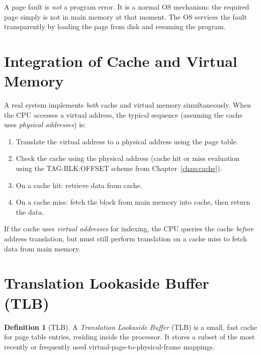 \documentclass[11pt, a4paper, notitlepage]{report}
\theoremstyle{definition}
\newtheorem{definition}[theorem]{Definition}
\theoremstyle{remark}
\theoremstyle{definition}
\begin{document}
\begin{warning}[title={Warning: Page Fault $\ne$ Error}]
  A page fault is \emph{not} a program error. It is a normal OS mechanism: the required page simply is not in main memory at that moment. The OS services the fault transparently by loading the page from disk and resuming the program.
\end{warning}

\section{Integration of Cache and Virtual Memory}
\label{sec:cache-vm-integration}

A real system implements \emph{both} cache and virtual memory simultaneously. When the CPU accesses a virtual address, the typical sequence (assuming the cache uses \emph{physical addresses}) is:

\begin{enumerate}
  \item Translate the virtual address to a physical address using the page table.
  \item Check the cache using the physical address (cache hit or miss evaluation using the TAG:BLK:OFFSET scheme from Chapter~\ref{chap:cache}).
  \item On a cache hit: retrieve data from cache.
  \item On a cache miss: fetch the block from main memory into cache, then return the data.
\end{enumerate}

If the cache uses \emph{virtual addresses} for indexing, the CPU queries the cache \emph{before} address translation, but must still perform translation on a cache miss to fetch data from main memory.

\section{Translation Lookaside Buffer (TLB)}
\label{sec:tlb}

\begin{definition}[TLB]
  \label{def:tlb}
  A \emph{Translation Lookaside Buffer} (TLB) is a small, fast cache for page table entries, residing inside the processor. It stores a subset of the most recently or frequently used virtual-page-to-physical-frame mappings.
\end{definition}
\end{document}
